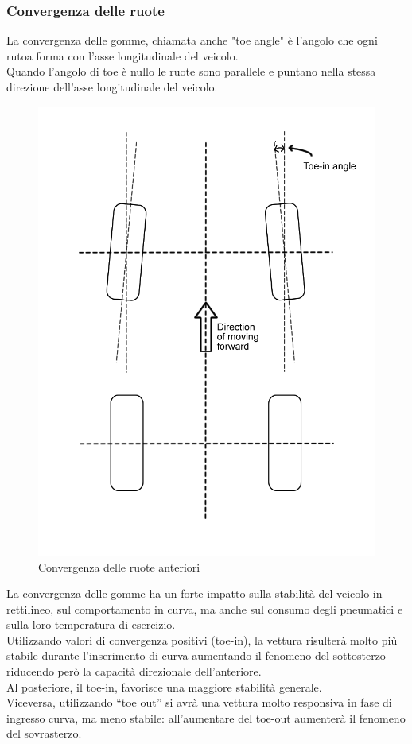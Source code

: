 \subsubsection{Convergenza delle ruote} \label{Toe}
La convergenza delle gomme, chiamata anche "toe angle" è l'angolo che ogni rutoa forma con l'asse longitudinale del veicolo.\\
Quando l'angolo di toe è nullo le ruote sono parallele e puntano nella stessa direzione dell'asse longitudinale del veicolo.\\
\begin{figure}[ht]
    \centering
    \includegraphics[scale=2]{Immagini/Lateral dynamics/Toe-in.png}
    \caption{Convergenza delle ruote anteriori}
    \label{fig:Toe-in}
\end{figure}
La convergenza delle gomme ha un forte impatto sulla stabilità del veicolo in rettilineo, sul comportamento in curva, ma anche sul consumo degli pneumatici e sulla loro temperatura di esercizio.\\ 
Utilizzando valori di convergenza positivi (toe-in), la vettura risulterà molto più stabile durante l'inserimento di curva aumentando il fenomeno del sottosterzo riducendo però la capacità direzionale dell'anteriore. \\
Al posteriore, il toe-in, favorisce una maggiore stabilità generale.\\
Viceversa, utilizzando “toe out” si avrà una vettura molto responsiva in fase di ingresso curva, ma meno stabile: all'aumentare del toe-out aumenterà il fenomeno del sovrasterzo.

